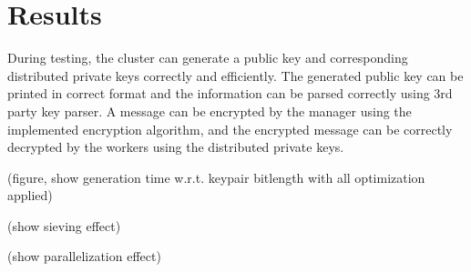 \chapter{Results}

During testing, the cluster can generate a public key and corresponding distributed private keys correctly and efficiently. The generated public key can be printed in correct format and the information can be parsed correctly using 3rd party key parser. A message can be encrypted by the manager using the implemented encryption algorithm, and the encrypted message can be correctly decrypted by the workers using the distributed private keys.

(figure, show generation time w.r.t. keypair bitlength with all optimization applied)

(show sieving effect)

(show parallelization effect)
